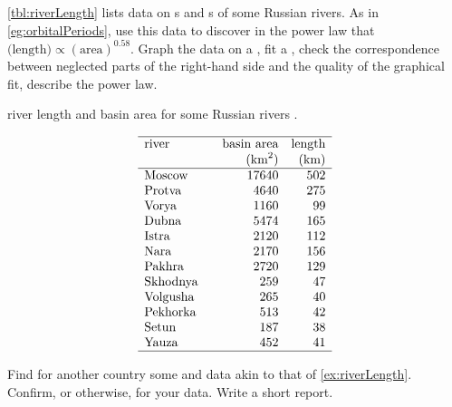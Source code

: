 \begin{exercise} \label{ex:riverLength} 
\autoref{tbl:riverLength} lists data on s and s of some Russian rivers. 
As in \autoref{eg:orbitalPeriods}, use this data to discover  in the power law that \(\text{(length)}\propto(\text{area})^{0.58}\).  
Graph the data on a , fit a , check the correspondence between neglected parts of the right-hand side and the quality of the graphical fit, describe the power law.
\setbox\ajrqrbox\hbox{}%
\marginajrbox%
\begin{table}
\caption{river length and basin area for some Russian rivers \cite[p.154]{Arnold2014}.}
\label{tbl:riverLength}
\begin{equation*}
\begin{array}{p{12ex}rr} \hline
river&\text{basin area}&\text{length}\\
&(\text{km}^2)&\text{(km)}\\\hline
Moscow& 17640 & 502 \\
Protva& 4640 & 275 \\
Vorya& 1160 & 99 \\
Dubna& 5474 & 165 \\
Istra& 2120 & 112 \\
Nara& 2170 & 156 \\
Pakhra& 2720 & 129 \\
Skhodnya& 259 & 47 \\
Volgusha& 265 & 40 \\
Pekhorka& 513 & 42 \\
Setun& 187 & 38 \\
Yauza& 452 & 41 \\
\hline
\end{array}
\end{equation*}
\end{table}%
\end{exercise}

\begin{exercise} \label{ex:riverLength2} 
Find for another country some  and  data akin to that of \autoref{ex:riverLength}.
Confirm, or otherwise,  for your data.  
Write a short report.
\end{exercise}


